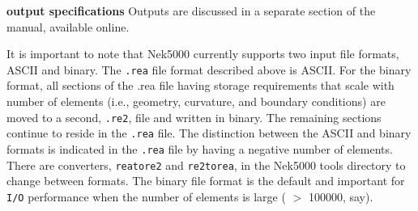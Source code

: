 \begin{description}

\item{\bf output specifications} 
     Outputs are discussed in a separate section of the manual, available online.
\end{description}


\noindent
It is important to note that Nek5000 currently supports two input file
formats, ASCII and binary.   The {\tt .rea} file format
described above is ASCII.  For the binary format, all sections
of the .rea file having storage requirements that scale with 
number of elements (i.e., geometry, curvature, and boundary 
conditions) are moved to a second, {\tt .re2}, file and
written in binary.   The remaining sections continue to 
reside in the {\tt .rea} file.   The distinction between
the ASCII and binary formats is indicated in the {\tt .rea}
file by having a negative number of elements.
There are converters, {\tt reatore2} and {\tt re2torea}, in the Nek5000
tools directory to change between formats.   The binary file
format is the default and important for {\tt I/O} performance when the
number of elements is large ( \(>\) 100000, say).
